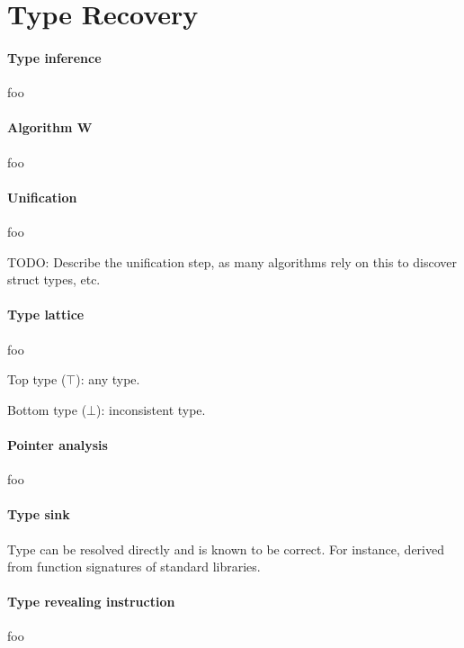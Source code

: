 \documentclass[10pt, a4paper, sigplan]{acmart}
\begin{document}
\section{Type Recovery}

\paragraph{Type inference}

foo

\paragraph{Algorithm W}

foo

\paragraph{Unification}

foo

TODO: Describe the unification step, as many algorithms rely on this to discover struct types, etc.

\paragraph{Type lattice}

foo

Top type ($\top$): any type.

Bottom type ($\bot$): inconsistent type.

\paragraph{Pointer analysis}

foo

\paragraph{Type sink}


Type can be resolved directly and is known to be correct. For instance, derived from function signatures of standard libraries.

\paragraph{Type revealing instruction}

foo
\end{document}
